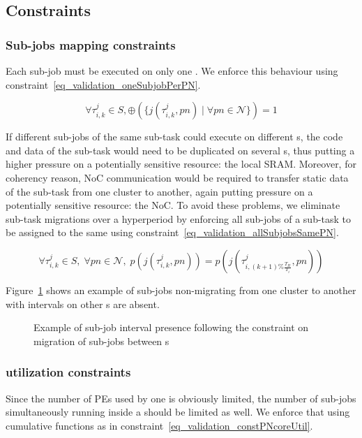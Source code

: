 \documentclass[main.tex]{subfiles}
\begin{document}
\subsection{Constraints}
\subsubsection{Sub-jobs mapping constraints}
Each sub-job must be executed on only one \PN{}. We enforce this behaviour using constraint~\ref{eq_validation_oneSubjobPerPN}.

\begin{equation}
    \label{eq_validation_oneSubjobPerPN}
    \forall \tau_{i,k}^j \in S ,  
    \oplus(\{ j( \tau_{i,k}^j , pn ) \; | \; \forall pn \in \mathcal{N}\})=1
\end{equation}

If different sub-jobs of the same sub-task could execute on different \PN{}s, the code and data of the sub-task would need to be duplicated on several \PN{}s, thus putting a higher pressure on a potentially sensitive resource: the local SRAM. Moreover, for coherency reason, NoC communication would be required to transfer static data of the sub-task from one cluster to another, again putting pressure on a potentially sensitive resource: the NoC. To avoid these problems, we eliminate sub-task migrations over a hyperperiod by enforcing all sub-jobs of a sub-task to be assigned to the same \PN{} using constraint~\ref{eq_validation_allSubjobsSamePN}.

\begin{equation}
    \label{eq_validation_allSubjobsSamePN}
    \forall \tau_{i,k}^j \in S, \; \forall pn \in \mathcal{N}, \;
    p( j( \tau_{i,k}^j, pn )) = p( j( \tau_{i,(k+1) \% \frac{T_H}{T_i}}^j, pn ))
\end{equation}

Figure~\ref{fig_validation_constJobMapping} shows an example of sub-jobs non-migrating from one cluster to another with intervals on other \PN{}s are absent.

\begin{figure}
    \centering
    \scalebox{0.9}{}
    \caption{Example of sub-job interval presence following the constraint on migration of sub-jobs between \PN{}s }
    \label{fig_validation_constJobMapping}
\end{figure}

\subsubsection{\PN{} utilization constraints}
Since the number of PEs used by one \PN{} is obviously limited, the number of sub-jobs simultaneously running inside a \PN{} should be limited as well. We enforce that using cumulative functions as in constraint~\ref{eq_validation_constPNcoreUtil}.
\end{document}
